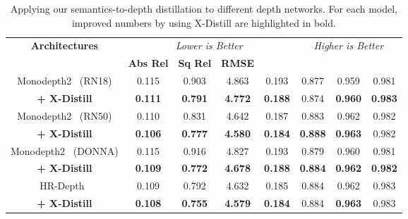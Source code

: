 \documentclass{bmvc2k}
\begin{document}
\begin{table}[h!]
\vspace{-5pt}
\centering
\scriptsize
\begin{tabular}[h]{ c | c  c  c  c | c  c  c}
\hline
\multirow{2}{*}{\textbf{Architectures}}  &\multicolumn{4}{c|}{\it Lower is Better} &\multicolumn{3}{c}{\it Higher is Better} \\
 &{\bf Abs Rel} &{\bf Sq Rel} &{\bf RMSE} &{\bf } &{\bf} &{\bf} &{\bf} \\
\hline
Monodepth2~\cite{godard2019digging} (RN18)  &0.115 &0.903 &4.863 &0.193 &0.877 &0.959 &0.981 \\
\textbf{+ X-Distill} &\textbf{0.111} &\textbf{0.791} &\textbf{4.772} &\textbf{0.188} &0.874 &\textbf{0.960} &\textbf{0.983} \\
\hdashline
Monodepth2~\cite{godard2019digging} (RN50)    &0.110 &0.831 &4.642 &0.187 &0.883 &0.962 &0.982 \\
\textbf{+ X-Distill} &\textbf{0.106} &\textbf{0.777} &\textbf{4.580} &\textbf{0.184} &\textbf{0.888} &\textbf{0.963} &0.982 \\
\hdashline
Monodepth2~\cite{godard2019digging} (DONNA)   &0.115 &0.916 &4.827 &0.193 &0.879 &0.960 &0.981 \\
\textbf{+ X-Distill} &\textbf{0.109} &\textbf{0.772} &\textbf{4.678} &\textbf{0.188} &\textbf{0.884} &\textbf{0.962} &\textbf{0.982} \\
\hdashline
HR-Depth~\cite{lyu2020hr}    &0.109 &0.792 &4.632 &0.185 &0.884 &0.962 &0.983 \\
\textbf{+ X-Distill} &\textbf{0.108} &\textbf{0.755} &\textbf{4.579} &\textbf{0.184} &0.884 &\textbf{0.963} &0.983 \\
\hline
\end{tabular}
\vspace{3pt}
\caption{\small Applying our semantics-to-depth distillation to different depth networks. For each model, improved numbers by using X-Distill are highlighted in bold.}
\label{tab:as_architecture}
\vspace{-5pt}
\end{table}

\vspace{-10pt}
\end{document}

